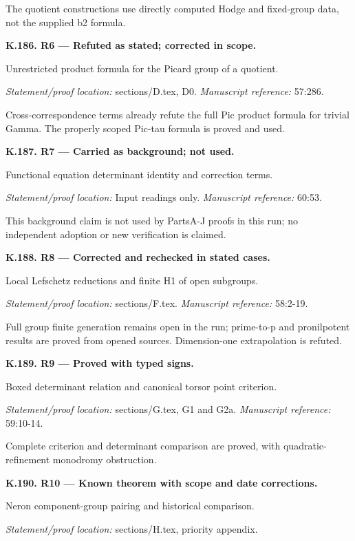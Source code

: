 \par The quotient constructions use directly computed Hodge and fixed-group data, not the supplied b2 formula.
\par\medskip\noindent\textbf{K.186. R6 --- Refuted as stated; corrected in scope.}\par
Unrestricted product formula for the Picard group of a quotient.
\par\emph{Statement/proof location:} sections/D.tex, D0.
\emph{Manuscript reference:} 57:286.
\par Cross-correspondence terms already refute the full Pic product formula for trivial Gamma. The properly scoped Pic-tau formula is proved and used.
\par\medskip\noindent\textbf{K.187. R7 --- Carried as background; not used.}\par
Functional equation determinant identity and correction terms.
\par\emph{Statement/proof location:} Input readings only.
\emph{Manuscript reference:} 60:53.
\par This background claim is not used by PartsA-J proofs in this run; no independent adoption or new verification is claimed.
\par\medskip\noindent\textbf{K.188. R8 --- Corrected and rechecked in stated cases.}\par
Local Lefschetz reductions and finite H1 of open subgroups.
\par\emph{Statement/proof location:} sections/F.tex.
\emph{Manuscript reference:} 58:2-19.
\par Full group finite generation remains open in the run; prime-to-p and pronilpotent results are proved from opened sources. Dimension-one extrapolation is refuted.
\par\medskip\noindent\textbf{K.189. R9 --- Proved with typed signs.}\par
Boxed determinant relation and canonical torsor point criterion.
\par\emph{Statement/proof location:} sections/G.tex, G1 and G2a.
\emph{Manuscript reference:} 59:10-14.
\par Complete criterion and determinant comparison are proved, with quadratic-refinement monodromy obstruction.
\par\medskip\noindent\textbf{K.190. R10 --- Known theorem with scope and date corrections.}\par
Neron component-group pairing and historical comparison.
\par\emph{Statement/proof location:} sections/H.tex, priority appendix.
